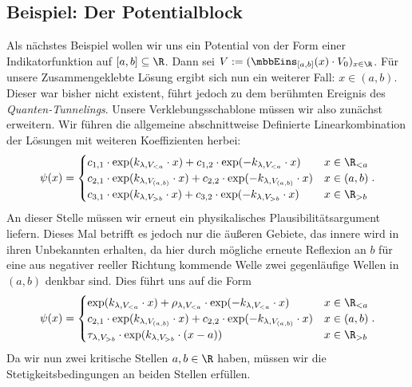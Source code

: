 \documentclass{subfiles}
\begin{document}
    \subsection{Beispiel: Der Potentialblock}
    Als nächstes Beispiel wollen wir uns ein Potential von der Form einer Indikatorfunktion auf $[a,b]\subseteq\R$. Dann sei $V:=(\mbbEins_{[a,b]}(x)\cdot V_0)_{x\in\R}$. Für unsere Zusammengeklebte Lösung ergibt sich nun ein weiterer Fall: $x\in(a,b)$. Dieser war bisher nicht existent, führt jedoch zu dem berühmten Ereignis des \emph{Quanten-Tunnelings}. Unsere Verklebungsschablone müssen wir also zunächst erweitern. Wir führen die allgemeine abschnittweise Definierte Linearkombination der Lösungen mit weiteren Koeffizienten herbei:
    \[
        \psi(x) = \begin{cases}
            c_{1,1}\cdot\exp(k_{\lambda,V_{<a}} \cdot x) + c_{1,2}\cdot\exp(-k_{\lambda,V_{<a}} \cdot x) & x\in\R_{<a} \\
            c_{2,1}\cdot\exp(k_{\lambda,V_{(a,b)}} \cdot x) + c_{2,2}\cdot\exp(-k_{\lambda,V_{(a,b)}} \cdot x) & x\in(a,b) \\
            c_{3,1}\cdot\exp(k_{\lambda,V_{>b}} \cdot x) + c_{3,2}\cdot\exp(-k_{\lambda,V_{>b}} \cdot x) & x\in\R_{>b}
        \end{cases}.
    \]
    An dieser Stelle müssen wir erneut ein physikalisches Plausibilitätsargument liefern. Dieses Mal betrifft es jedoch nur die äußeren Gebiete, das innere wird in ihren Unbekannten erhalten, da hier durch mögliche erneute Reflexion an $b$ für eine aus negativer reeller Richtung kommende Welle zwei gegenläufige Wellen in $(a,b)$ denkbar sind. Dies führt uns auf die Form 
    \[
        \psi(x) = \begin{cases}
            \exp(k_{\lambda,V_{<a}}\cdot x) + \rho_{\lambda,V_{<a}}\cdot\exp(-k_{\lambda,V_{<a}}\cdot x) & x\in\R_{<a} \\
            c_{2,1}\cdot\exp(k_{\lambda,V_{(a,b)}}\cdot x) + c_{2,2}\cdot\exp(-k_{\lambda,V_{(a,b)}}\cdot x) & x\in(a,b) \\
            \tau_{\lambda,V_{>b}}\cdot\exp(k_{\lambda,V_{>b}}\cdot (x - a)) & x\in\R_{>b}
        \end{cases}.
    \]
    Da wir nun zwei kritische Stellen $a,b\in\R$ haben, müssen wir die Stetigkeitsbedingungen an beiden Stellen erfüllen.
\end{document}
